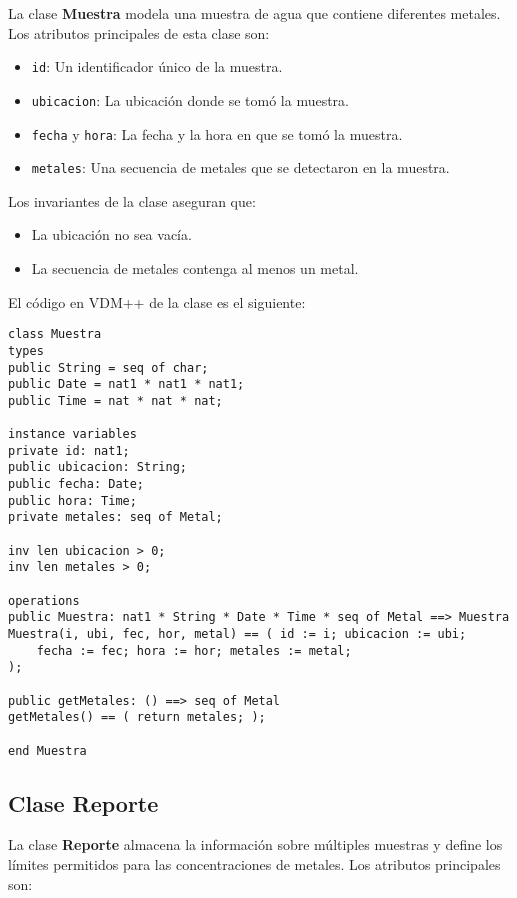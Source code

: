 La clase \textbf{Muestra} modela una muestra de agua que contiene diferentes metales. Los atributos principales de esta clase son:

\begin{itemize}
    \item \texttt{id}: Un identificador único de la muestra.
    \item \texttt{ubicacion}: La ubicación donde se tomó la muestra.
    \item \texttt{fecha} y \texttt{hora}: La fecha y la hora en que se tomó la muestra.
    \item \texttt{metales}: Una secuencia de metales que se detectaron en la muestra.
\end{itemize}

Los invariantes de la clase aseguran que:

\begin{itemize}
    \item La ubicación no sea vacía.
    \item La secuencia de metales contenga al menos un metal.
\end{itemize}

El código en VDM++ de la clase es el siguiente:

\begin{lstlisting}
class Muestra
types
public String = seq of char;
public Date = nat1 * nat1 * nat1;
public Time = nat * nat * nat;

instance variables
private id: nat1;
public ubicacion: String;
public fecha: Date;
public hora: Time;
private metales: seq of Metal;

inv len ubicacion > 0;
inv len metales > 0;

operations
public Muestra: nat1 * String * Date * Time * seq of Metal ==> Muestra
Muestra(i, ubi, fec, hor, metal) == ( id := i; ubicacion := ubi;
	fecha := fec; hora := hor; metales := metal;
);

public getMetales: () ==> seq of Metal
getMetales() == ( return metales; );

end Muestra
\end{lstlisting}

\subsection{Clase Reporte}

La clase \textbf{Reporte} almacena la información sobre múltiples muestras y define los límites permitidos para las concentraciones de metales. Los atributos principales son:

